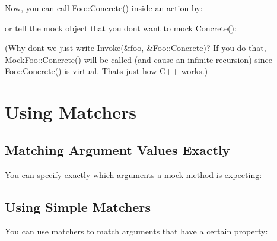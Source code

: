 Now, you can call {\ttfamily Foo\+::\+Concrete()} inside an action by\+:


\begin{DoxyCode}{0}
\end{DoxyCode}


or tell the mock object that you don\textquotesingle{}t want to mock {\ttfamily Concrete()}\+:


\begin{DoxyCode}{0}
\end{DoxyCode}


(Why don\textquotesingle{}t we just write {\ttfamily Invoke(\&foo, \&\+Foo\+::\+Concrete)}? If you do that, {\ttfamily Mock\+Foo\+::\+Concrete()} will be called (and cause an infinite recursion) since {\ttfamily Foo\+::\+Concrete()} is virtual. That\textquotesingle{}s just how C++ works.)

\section*{Using Matchers}

\subsection*{Matching Argument Values Exactly}

You can specify exactly which arguments a mock method is expecting\+:


\begin{DoxyCode}{0}
\end{DoxyCode}


\subsection*{Using Simple Matchers}

You can use matchers to match arguments that have a certain property\+:


\begin{DoxyCode}{0}
\end{DoxyCode}


